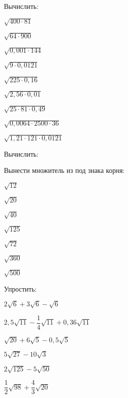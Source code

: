 \begin{class}[number=4]
	\begin{listofex}
		\item Вычислить:
		\begin{enumcols}[itemcolumns=3]
			\item \( \sqrt{400\cdot81} \)
			\item \( \sqrt{64\cdot900} \)
			\item \( \sqrt{0,001\cdot144} \)
			\item \( \sqrt{9\cdot0,0121} \)
			\item \( \sqrt{225\cdot0,16} \)
			\item \( \sqrt{2,56\cdot0,01} \)
			\item \( \sqrt{25\cdot81\cdot0,49} \)
			\item \( \sqrt{0,0064\cdot2500\cdot36} \)
			\item \( \sqrt{1,21\cdot121\cdot0,0121} \)
		\end{enumcols}
		\item Вычислить:
		\begin{enumcols}[itemcolumns=2]
			\item {}
			\item {}
		\end{enumcols}
		\item Вынести множитель из под знака корня:
		\begin{enumcols}[itemcolumns=8]
			\item \( \sqrt{12} \)
			\item \( \sqrt{20} \)
			\item \( \sqrt{40} \)
			\item \( \sqrt{125} \)
			\item \( \sqrt{72} \)
			\item \( \sqrt{360} \)
			\item \( \sqrt{500} \)
		\end{enumcols}
		\item Упростить:
		\begin{enumcols}[itemcolumns=3]
			\item \( 2\sqrt{6}+3\sqrt{6}-\sqrt{6} \)
			\item \( 2,5\sqrt{11}-\dfrac{1}{4}\sqrt{11}+0,36\sqrt{11} \)
			\item \( \sqrt{20}+6\sqrt{5}-0,5\sqrt{5} \)
			\item \( 5\sqrt{27}-10\sqrt{3} \)
			\item \( 2\sqrt{125}-5\sqrt{50} \)
			\item \( \dfrac{1}{2}\sqrt{98}+\dfrac{4}{3}\sqrt{20} \)

\end{enumcols}
\end{listofex}
\end{class}
